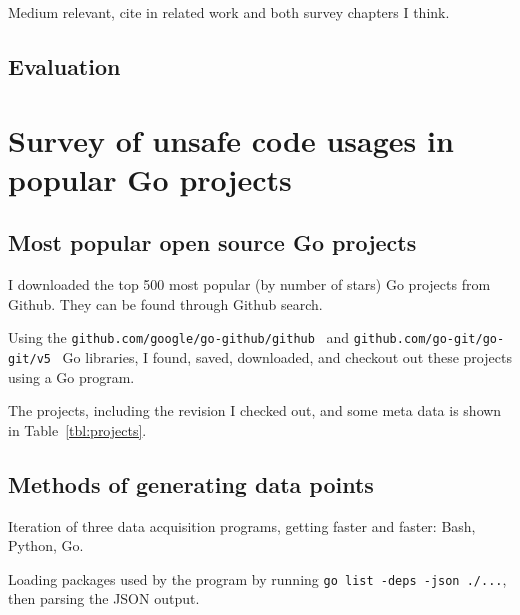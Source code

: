 Medium relevant, cite in related work and both survey chapters I think.




\section{Evaluation}


\chapter{Survey of unsafe code usages in popular Go projects}\label{ch:survey}




\section{Most popular open source Go projects}\label{sec:most-popular-projects}

I downloaded the top 500 most popular (by number of stars) Go projects from Github.
They can be found through Github search.

Using the \texttt{github.com/google/go-github/github}~\cite{gogithub} and \texttt{github.com/go-git/go-git/v5}~\cite{gogit}
Go libraries, I found, saved, downloaded, and checkout out these projects using a Go program.

The projects, including the revision I checked out, and some meta data is shown in Table~\ref{tbl:projects}.



\section{Methods of generating data points}\label{sec:survey-acquisition-methods}

Iteration of three data acquisition programs, getting faster and faster: Bash, Python, Go.

Loading packages used by the program by running \texttt{go list -deps -json ./...}, then parsing the JSON output.

